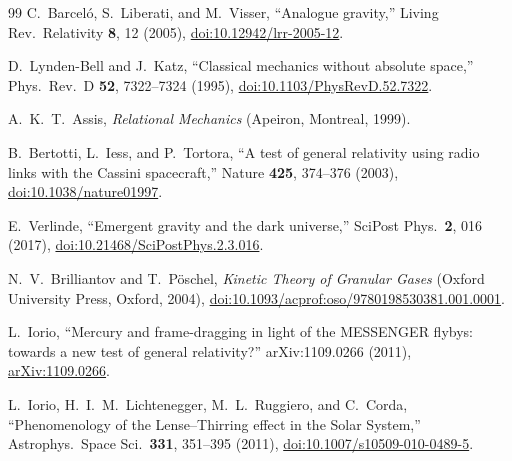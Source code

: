 \documentclass[aps,reprint,amsmath,amssymb,nofootinbib,superscriptaddress,floatfix]{revtex4-2}
\begin{document}
\begin{thebibliography}{99}
C.~Barcel\'o, S.~Liberati, and M.~Visser, ``Analogue gravity,''
Living Rev.\ Relativity \textbf{8}, 12 (2005),
\href{https://doi.org/10.12942/lrr-2005-12}{doi:10.12942/lrr-2005-12}.

D.~Lynden-Bell and J.~Katz, ``Classical mechanics without absolute
space,'' Phys.\ Rev.\ D \textbf{52}, 7322--7324 (1995),
\href{https://doi.org/10.1103/PhysRevD.52.7322}
{doi:10.1103/PhysRevD.52.7322}.

A.~K.~T.~Assis, \emph{Relational Mechanics}
(Apeiron, Montreal, 1999).

B.~Bertotti, L.~Iess, and P.~Tortora, ``A test of general relativity
using radio links with the Cassini spacecraft,''
Nature \textbf{425}, 374--376 (2003),
\href{https://doi.org/10.1038/nature01997}{doi:10.1038/nature01997}.

E.~Verlinde, ``Emergent gravity and the dark universe,''
SciPost Phys.\ \textbf{2}, 016 (2017),
\href{https://doi.org/10.21468/SciPostPhys.2.3.016}
{doi:10.21468/SciPostPhys.2.3.016}.

N.~V.~Brilliantov and T.~P\"oschel,
\emph{Kinetic Theory of Granular Gases}
(Oxford University Press, Oxford, 2004),
\href{https://doi.org/10.1093/acprof:oso/9780198530381.001.0001}
{doi:10.1093/acprof:oso/9780198530381.001.0001}.

L.~Iorio, ``Mercury and frame-dragging in light of the MESSENGER
flybys: towards a new test of general relativity?''
arXiv:1109.0266 (2011),
\href{https://arxiv.org/abs/1109.0266}{arXiv:1109.0266}.

L.~Iorio, H.~I.~M.~Lichtenegger, M.~L.~Ruggiero, and C.~Corda,
``Phenomenology of the Lense--Thirring effect in the Solar System,''
Astrophys.\ Space Sci.\ \textbf{331}, 351--395 (2011),
\href{https://doi.org/10.1007/s10509-010-0489-5}
{doi:10.1007/s10509-010-0489-5}.

\end{thebibliography}
\end{document}
